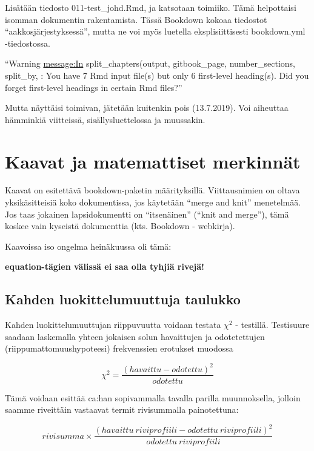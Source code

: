 \documentclass[finnish,]{book}
\begin{document}
Lisätään tiedosto 011-test\_johd.Rmd, ja katsotaan toimiiko. Tämä helpottaisi
isomman dokumentin rakentamista. Tässä Bookdown kokoaa tiedostot ``aakkosjärjestyksessä'',
mutta ne voi myös luetella eksplisiittisesti bookdown.yml -tiedostossa.

``Warning \url{message:In} split\_chapters(output, gitbook\_page, number\_sections, split\_by, :
You have 7 Rmd input file(s) but only 6 first-level heading(s). Did you forget first-level headings in certain Rmd files?''

Mutta näyttäisi toimivan, jätetään kuitenkin pois (13.7.2019). Voi aiheuttaa hämminkiä viitteissä, sisällysluettelossa ja muussakin.

\hypertarget{kaavat-ja-matemattiset-merkinnat}{%
\chapter{Kaavat ja matemattiset merkinnät}\label{kaavat-ja-matemattiset-merkinnat}}

Kaavat on esitettävä bookdown-paketin määrityksillä. Viittausnimien on oltava yksikäsitteisiä koko dokumentissa, jos käytetään ``merge and knit'' menetelmää. Jos taas jokainen lapsidokumentti on ``itsenäinen'' (``knit and merge''), tämä koskee vain kyseistä dokumenttia (kts. Bookdown - webkirja).

Kaavoissa iso ongelma heinäkuussa oli tämä:

\textbf{equation-tägien välissä ei saa olla tyhjiä rivejä!}

\hypertarget{kahden-luokittelumuuttuja-taulukko}{%
\section{Kahden luokittelumuuttuja taulukko}\label{kahden-luokittelumuuttuja-taulukko}}

Kahden luokittelumuuttujan riippuvuutta voidaan testata \(\chi^{2}\) - testillä. Testisuure saadaan laskemalla yhteen jokaisen solun havaittujen ja odotetettujen (riippumattomuushypoteesi) frekvenssien erotukset muodossa

\begin{equation}
  \chi^{2} = \frac{(havaittu - odotettu)^2} {odotettu}
  \label{eq:khii21}
\end{equation}

Tämä voidaan esittää ca:han sopivammalla tavalla parilla muunnoksella, jolloin saamme riveittäin vastaavat termit rivisummalla painotettuna:

\begin{equation}
  rivisumma \times \frac{(havaittu \: riviprofiili - odotettu \: riviprofiili)^2} {odotettu \: riviprofiili}
  \label{eq:khii22}
\end{equation}
\end{document}
